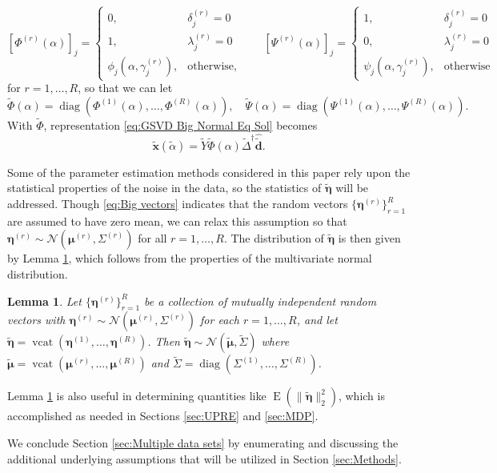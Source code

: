 \documentclass[12pt]{article}
\newcommand{\dVec}{\mathbf{d}}	%
\newcommand{\xVec}{\mathbf{x}}	%
\newcommand{\pinv}[1]{{#1}^\dagger}	%
\DeclareMathOperator{\diag}{diag}	%
\DeclareMathOperator{\vcat}{vcat}	%
\newcommand{\regparam}{\alpha}  %
\newcommand{\regparamBig}{\widetilde{\regparam}}   %
\newcommand{\xBig}{\widetilde{\xVec}}	%
\newcommand{\dBig}{\widetilde{\dVec}}	%
\newcommand{\filt}{\phi}
\newcommand{\mfilt}{\psi}
\newcommand{\noise}{\eta}	%
\newcommand{\noiseVec}{\bm{\noise}}	%
\DeclareMathOperator{\E}{E}	%
\newcommand{\svd}[1]{\widehat{#1}}	%
\newtheorem{lemma}{Lemma}[section]
\begin{document}
\[\left[\Phi^{(r)}\left(\regparam\right)\right]_j = \begin{cases}
0, & \delta_j^{(r)} = 0 \\
1, & \lambda_j^{(r)} = 0 \\
\filt_j\left(\regparam,\gamma_j^{(r)}\right), & \text{otherwise,}
\end{cases} \qquad
\left[\Psi^{(r)}\left(\regparam\right)\right]_j = \begin{cases}
1, & \delta_j^{(r)} = 0 \\
0, & \lambda_j^{(r)} = 0 \\
\mfilt_j\left(\regparam,\gamma_j^{(r)}\right), & \text{otherwise}
\end{cases}\]
for $r = 1,\ldots,R$, so that we can let
\[\widetilde{\Phi}(\regparam) = \diag\left(\Phi^{(1)}(\regparam),\ldots,\Phi^{(R)}(\regparam)\right), \quad \widetilde{\Psi}(\regparam) = \diag\left(\Psi^{(1)}(\regparam),\ldots,\Psi^{(R)}(\regparam)\right).\]
With $\widetilde{\Phi}$, representation \eqref{eq:GSVD Big Normal Eq Sol} becomes
\[\xBig(\regparamBig) = \widetilde{Y}\widetilde{\Phi}(\regparam)\pinv{\widetilde{\Delta}}\svd{\dBig}.\]

Some of the parameter estimation methods considered in this paper rely upon the statistical properties of the noise in the data, so the statistics of $\widetilde{\noiseVec}$ will be addressed. Though \eqref{eq:Big vectors} indicates that the random vectors $\{\noiseVec^{(r)}\}_{r=1}^R$ are assumed to have zero mean, we can relax this assumption so that $\noiseVec^{(r)} \sim \mathcal{N}(\bm{\mu}^{(r)},\Sigma^{(r)})$ for all $r = 1,\ldots,R$. The distribution of $\widetilde{\noiseVec}$ is then given by Lemma \ref{lem:Concatenation of Normal Noise}, which follows from the properties of the multivariate normal distribution. 
\begin{lemma}
\label{lem:Concatenation of Normal Noise}
Let $\{\noiseVec^{(r)}\}_{r=1}^R$ be a collection of mutually independent random vectors with $\noiseVec^{(r)} \sim \mathcal{N}(\bm{\mu}^{(r)},\Sigma^{(r)})$ for each $r = 1,\ldots,R$, and let $\widetilde{\noiseVec} = \vcat(\noiseVec^{(1)},\ldots,\noiseVec^{(R)})$. Then $\widetilde{\noiseVec} \sim \mathcal{N}(\widetilde{\bm{\mu}},\widetilde{\Sigma})$ where $\widetilde{\bm{\mu}} = \vcat(\bm{\mu}^{(r)},\ldots,\bm{\mu}^{(R)})$ and $\widetilde{\Sigma} = \diag(\Sigma^{(1)},\ldots,\Sigma^{(R)})$.
\end{lemma}
\noindent Lemma \ref{lem:Concatenation of Normal Noise} is also useful in determining quantities like $\E(\|\widetilde{\noiseVec}\|_2^2)$, which is accomplished as needed in Sections \ref{sec:UPRE} and \ref{sec:MDP}. \par
We conclude Section \ref{sec:Multiple data sets} by enumerating and discussing the additional underlying assumptions that will be utilized in Section \ref{sec:Methods}.
\end{document}
